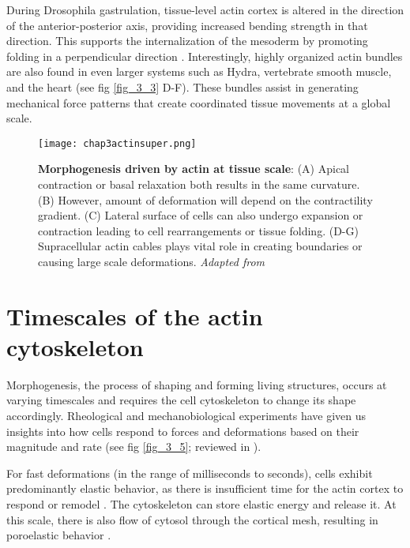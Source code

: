 During Drosophila gastrulation, tissue-level actin cortex is altered in the direction of the anterior-posterior axis, providing increased bending strength in that direction. This supports the internalization of the mesoderm by promoting folding in a perpendicular direction \cite{yevick2019}. Interestingly, highly organized actin bundles are also found in even larger systems such as Hydra, vertebrate smooth muscle, and the heart \cite{maroudas-sacks2021, palmer2021, cetera2014, helm2005} (see fig \ref{fig_3_3} D-F). These bundles assist in generating mechanical force patterns that create coordinated tissue movements at a global scale.


\begin{figure}
	\centering
	\texttt{[image: chap3actinsuper.png]}
	\caption{\label{fig_3_4} \textbf{Morphogenesis driven by actin at tissue scale}: (A) Apical contraction or basal relaxation both results in the same curvature. (B) However, amount of deformation will depend on the contractility gradient. (C) Lateral surface of cells can also undergo expansion or contraction leading to cell rearrangements or tissue folding. (D-G) Supracellular actin cables plays vital role in creating boundaries or causing large scale deformations. \textit{Adapted from \cite{clarke2021}}
	}
\end{figure}

\hypertarget{timescales-of-the-actin-cytoskeleton}{%
	\section{Timescales of the actin
		cytoskeleton}\label{timescales-of-the-actin-cytoskeleton}}

Morphogenesis, the process of shaping and forming living structures, occurs at varying timescales and requires the cell cytoskeleton to change its shape accordingly. Rheological and mechanobiological experiments have given us insights into how cells respond to forces and deformations based on their magnitude and rate (see fig \ref{fig_3_5}; reviewed in \cite{wyatt2016}).

For fast deformations (in the range of milliseconds to seconds), cells exhibit predominantly elastic behavior, as there is insufficient time for the actin cortex to respond or remodel \cite{deng2006}. The cytoskeleton can store elastic energy and release it. At this scale, there is also flow of cytosol through the cortical mesh, resulting in poroelastic behavior \cite{moeendarbary2013}.

